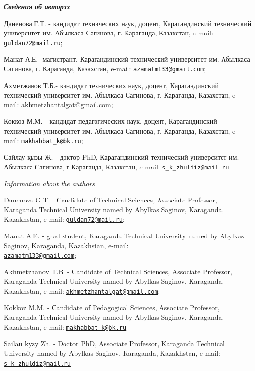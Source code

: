 \begin{authorinfo}
\emph{{\bfseries Сведения об авторах}}

Даненова Г.Т. - кандидат технических наук, доцент, Карагандинский
технический университет им. Абылкаса Сагинова, г. Караганда, Казахстан,
e-mail: \href{mailto:guldan72@mail.ru}{\nolinkurl{guldan72@mail.ru}};

Манат А.Е.- магистрант, Карагандинский технический университет им.
Абылкаса Сагинова, г. Караганда, Казахстан, e-mail:
\href{mailto:azamatm133@gmail.com}{\nolinkurl{azamatm133@gmail.com}};

Ахметжанов Т.Б.- кандидат технических наук, доцент, Карагандинский
технический университет им. Абылкаса Сагинова, г. Караганда, Казахстан,
e-mail: akhmetzhantalgat@gmail.com;

Коккоз М.М. - кандидат педагогических наук, доцент, Карагандинский
технический университет им. Абылкаса Сагинова, г. Караганда, Казахстан,
e-mail: \href{mailto:makhabbat_k@bk.ru}{\nolinkurl{makhabbat\_k@bk.ru}};

Сайлау қызы Ж. - доктор PhD, Карагандинский технический университет им.
Абылкаса Сагинова, г.Караганда, Казахстан, e-mail:
\href{mailto:s_k_zhuldiz@mail.ru}{\nolinkurl{s\_k\_zhuldiz@mail.ru}}

\emph{Information about the authors}

Danenova G.T. - Сandidate of Technical Sciences, Associate Professor,
Karaganda Technical University named by Abylkas Saginov, Karaganda,
Kazakhstan, e-mail:
\href{mailto:guldan72@mail.ru}{\nolinkurl{guldan72@mail.ru}};

Manat A.E. - grad student, Karaganda Technical University named by
Abylkas Saginov, Karaganda, Kazakhstan, e-mail:\\
\href{mailto:azamatm133@gmail.com}{\nolinkurl{azamatm133@gmail.com}};

Akhmetzhanov T.B. - Сandidate of Technical Sciences, Associate
Professor, Karaganda Technical University named by Abylkas Saginov,
Karaganda, Kazakhstan, e-mail:
\href{mailto:akhmetzhantalgat@gmail.com}{\nolinkurl{akhmetzhantalgat@gmail.com}};

Kokkoz M.M. - Сandidate of Pedagogical Sciences, Associate Professor,
Karaganda Technical University named by Abylkas Saginov, Karaganda,
Kazakhstan, e-mail:
\href{mailto:makhabbat_k@bk.ru}{\nolinkurl{makhabbat\_k@bk.ru}};

Sailau kyzy Zh. - Doctor PhD, Associate Professor, Karaganda Technical
University named by Abylkas Saginov, Karaganda, Kazakhstan, e-mail:
\href{mailto:s_k_zhuldiz@mail.ru}{\nolinkurl{s\_k\_zhuldiz@mail.ru}}
\end{authorinfo}
